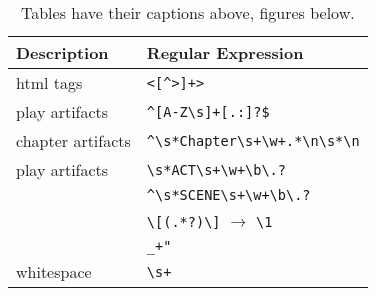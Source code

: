 \begin{table}[H]%
  \caption{Tables have their captions above, figures below.}
  \label{table-with-numbers}%
  \centering\small
  \begin{tabular}{@{}ll@{}} %
    \toprule
    \textbf{Description} & \textbf{Regular Expression}  \\
    \midrule
            html tags             & \verb|<[^>]+>| \\
            play artifacts        & \verb|^[A-Z\s]+[.:]?$| \\
            chapter artifacts     & \verb|^\s*Chapter\s+\w+.*\n\s*\n| \\
            play artifacts        & \verb|\s*ACT\s+\w+\b\.?| \\
                                  & \verb|^\s*SCENE\s+\w+\b\.?| \\
                                  & \verb|\[(.*?)\]| $\rightarrow$ \verb|\1| \\
                                  & \verb|_+"| \\
            whitespace           & \verb|\s+| \\


    \bottomrule
  \end{tabular}
\end{table}












